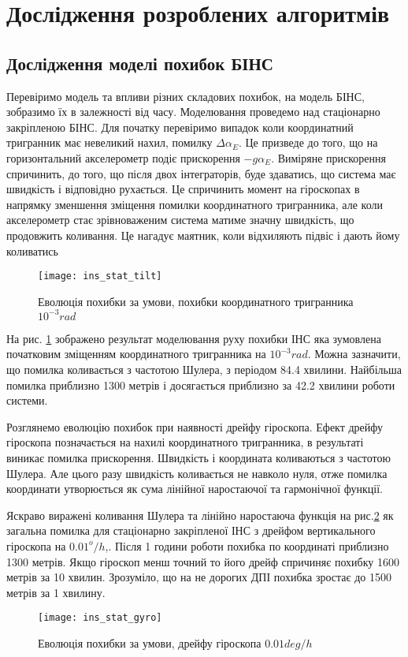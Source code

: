 \section{Дослідження розроблених алгоритмів}

\subsection{Дослідження моделі похибок БІНС}

Перевіримо модель та впливи різних складових похибок, на модель БІНС, зобразимо їх в
залежності від часу. Моделювання проведемо над стаціонарно закріпленою БІНС.
Для початку перевіримо випадок коли координатний тригранник має невеликий нахил,
помилку $\Delta \alpha_{E}$. Це призведе до того, що на горизонтальний акселерометр
подіє прискорення $-g \alpha_{E}$. Виміряне прискорення спричинить, до того, що після
двох інтеграторів, буде здаватись, що система має швидкість і відповідно рухається.
Це спричинить момент на гіроскопах в напрямку зменшення зміщення помилки
координатного тригранника, але коли акселерометр стає зрівноваженим система 
матиме значну швидкість, що продовжить коливання. Це нагадує маятник, коли відхиляють
підвіс і дають йому коливатись

\begin{figure}[here]
\centering
\texttt{[image: ins\_stat\_tilt]}
\caption{Еволюція похибки за умови, похибки координатного тригранника $10^{-3} rad$}
\label{fig:ins_stat_tilt}
\end{figure}

На рис. \ref{fig:ins_stat_tilt} зображено результат моделювання руху похибки ІНС
яка зумовлена початковим зміщенням координатного тригранника на $10^{-3} rad$.
Можна зазначити, що помилка коливається з частотою Шулера, з періодом 84.4 хвилини.
Найбільша помилка приблизно 1300 метрів і досягається приблизно за 42.2 хвилини роботи системи.

Розглянемо еволюцію похибок при наявності дрейфу гіроскопа. Ефект дрейфу гіроскопа позначається на нахилі координатного тригранника, в результаті виникає помилка прискорення. Швидкість і координата коливаються з частотою Шулера. Але цього разу швидкість
коливається не навколо нуля, отже помилка координати утворюється як сума лінійної наростаючої та гармонічної функції.

 Яскраво виражені коливання Шулера та лінійно наростаюча функція на рис.\ref{fig:ins_stat_gyro} як загальна помилка для стаціонарно закріпленої ІНС з дрейфом вертикального гіроскопа на $0.01^{o}/h$,. Після 1 години роботи похибка по координаті приблизно 1300 метрів. Якщо гіроскоп менш точний то його дрейф спричиняє похибку 1600 метрів за 10 хвилин. Зрозуміло, що на не дорогих ДПІ похибка зростає до 1500 метрів за 1 хвилину.
\begin{figure}[here]
\centering
\texttt{[image: ins\_stat\_gyro]}
\caption{Еволюція похибки за умови, дрейфу гіроскопа $0.01 deg/h$}
\label{fig:ins_stat_gyro}
\end{figure}

